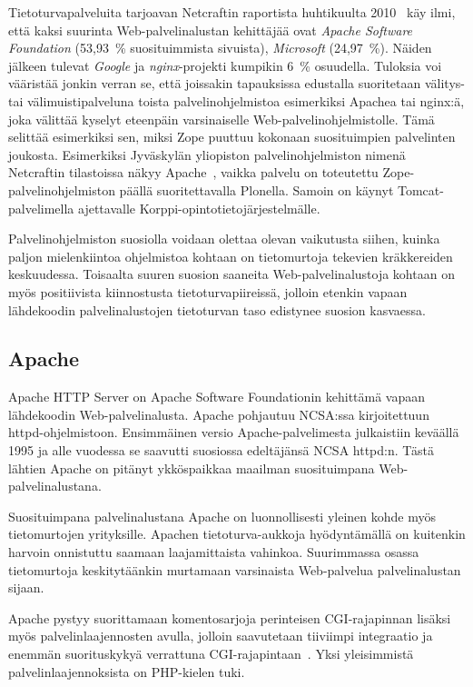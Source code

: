 Tietoturvapalveluita tarjoavan Netcraftin raportista
huhtikuulta 2010~\cite{netcraft} käy ilmi, että kaksi suurinta
Web-palvelinalustan kehittäjää ovat \textit{Apache Software Foundation} (53,93~\% suosituimmista
sivuista), \textit{Microsoft} (24,97~\%). Näiden jälkeen tulevat
\textit{Google} ja \textit{nginx}-projekti kumpikin 6~\% osuudella.
Tuloksia voi vääristää jonkin verran se, että joissakin tapauksissa
edustalla suoritetaan välitys- tai välimuistipalveluna toista
palvelinohjelmistoa esimerkiksi Apachea tai nginx:ä, joka välittää
kyselyt eteenpäin varsinaiselle
Web-\-palvelinohjelmistolle. Tämä selittää esimerkiksi
sen, miksi Zope puuttuu kokonaan suosituimpien palvelinten
joukosta. Esimerkiksi Jyväskylän yliopiston palvelinohjelmiston nimenä
Netcraftin tilastoissa näkyy Apache~\cite{netcraft_jyu}, vaikka
palvelu on toteutettu Zope-\-palvelinohjelmiston päällä
suoritettavalla Plonella. Samoin on käynyt Tomcat-\-palvelimella
ajettavalle Korppi-\-opintotietojärjestelmälle.

Palvelinohjelmiston suosiolla voidaan olettaa olevan vaikutusta
siihen, kuinka paljon mielenkiintoa ohjelmistoa kohtaan on
tietomurtoja tekevien kräkkereiden keskuudessa. Toisaalta
suuren suosion saaneita Web-palvelinalustoja kohtaan on myös
positiivista kiinnostusta tietoturvapiireissä, jolloin etenkin vapaan
lähdekoodin palvelinalustojen tietoturvan taso edistynee suosion
kasvaessa.

\subsection{Apache}

Apache HTTP Server on Apache Software Foundationin kehittämä vapaan
lähdekoodin Web-palvelinalusta. Apache pohjautuu NCSA:ssa
kirjoitettuun httpd-\-ohjelmistoon. Ensimmäinen versio
Apache-palvelimesta julkaistiin keväällä 1995 ja alle vuodessa se
saavutti suosiossa edeltäjänsä NCSA httpd:n. Tästä lähtien Apache on 
pitänyt ykköspaikkaa maailman suosituimpana Web-palvelinalustana.~\cite{apache}

Suosituimpana palvelinalustana Apache on luonnollisesti yleinen kohde
myös tietomurtojen yrityksille. Apachen tietoturva-aukkoja
hyödyntämällä on kuitenkin harvoin onnistuttu saamaan laajamittaista
vahinkoa. Suurimmassa osassa tietomurtoja keskitytäänkin murtamaan
varsinaista Web-palvelua palvelinalustan
sijaan.  %

Apache pystyy suorittamaan komentosarjoja perinteisen CGI-rajapinnan
lisäksi myös palvelinlaajennosten avulla, jolloin saavutetaan
tiiviimpi integraatio ja enemmän suorituskykyä verrattuna
CGI-rajapintaan~\cite{cginopeus}. Yksi yleisimmistä
palvelinlaajennoksista on PHP-kielen tuki.

